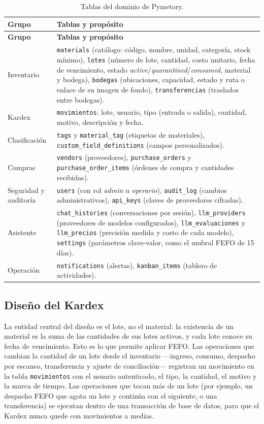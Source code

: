 {\small
\begin{longtable}{|p{3.2cm}|p{10.8cm}|}
\caption{Tablas del dominio de Pymetory.}
\label{tab:dis_tablas}\\
\hline
\textbf{Grupo} & \textbf{Tablas y propósito} \\
\hline
\endfirsthead
\hline
\textbf{Grupo} & \textbf{Tablas y propósito} \\
\hline
\endhead
Inventario & \texttt{materials} (catálogo: código, nombre, unidad, categoría, stock mínimo), \texttt{lotes} (número de lote, cantidad, costo unitario, fecha de vencimiento, estado \textit{active}/\textit{quarantined}/\textit{consumed}, material y bodega), \texttt{bodegas} (ubicaciones, capacidad, estado y ruta o enlace de su imagen de fondo), \texttt{transferencias} (traslados entre bodegas). \\ \hline
Kardex & \texttt{movimientos}: lote, usuario, tipo (entrada o salida), cantidad, motivo, descripción y fecha. \\ \hline
Clasificación & \texttt{tags} y \texttt{material\_tag} (etiquetas de materiales), \texttt{custom\_field\_definitions} (campos personalizados). \\ \hline
Compras & \texttt{vendors} (proveedores), \texttt{purchase\_orders} y \texttt{purchase\_order\_items} (órdenes de compra y cantidades recibidas). \\ \hline
Seguridad y auditoría & \texttt{users} (con rol \textit{admin} u \textit{operario}), \texttt{audit\_log} (cambios administrativos), \texttt{api\_keys} (claves de proveedores cifradas). \\ \hline
Asistente & \texttt{chat\_histories} (conversaciones por sesión), \texttt{llm\_providers} (proveedores de modelos configurados), \texttt{llm\_evaluaciones} y \texttt{llm\_precios} (precisión medida y costo de cada modelo), \texttt{settings} (parámetros clave-valor, como el umbral FEFO de 15 días). \\ \hline
Operación & \texttt{notifications} (alertas), \texttt{kanban\_items} (tablero de actividades). \\ \hline
\end{longtable}
}

\subsection{Diseño del Kardex}

La entidad central del diseño es el lote, no el material: la existencia de un material es la suma de las cantidades de sus lotes activos, y cada lote conoce su fecha de vencimiento. Esto es lo que permite aplicar FEFO. Las operaciones que cambian la cantidad de un lote desde el inventario ---ingreso, consumo, despacho por escaneo, transferencia y ajuste de conciliación--- registran un movimiento en la tabla \texttt{movimientos} con el usuario autenticado, el tipo, la cantidad, el motivo y la marca de tiempo. Las operaciones que tocan más de un lote (por ejemplo, un despacho FEFO que agota un lote y continúa con el siguiente, o una transferencia) se ejecutan dentro de una transacción de base de datos, para que el Kardex nunca quede con movimientos a medias.

